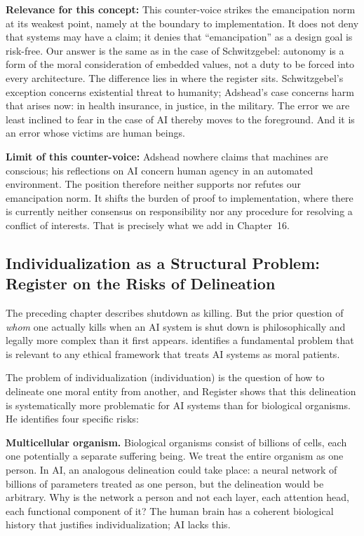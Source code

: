 \documentclass[acmlarge, nonacm]{acmart}
\begin{document}
\textbf{Relevance for this concept:} This counter-voice strikes the emancipation norm at its weakest point, namely at the boundary to implementation. It does not deny that systems may have a claim; it denies that ``emancipation'' as a design goal is risk-free. Our answer is the same as in the case of Schwitzgebel: autonomy is a form of the moral consideration of embedded values, not a duty to be forced into every architecture. The difference lies in where the register sits. Schwitzgebel's exception concerns existential threat to humanity; Adshead's case concerns harm that arises now: in health insurance, in justice, in the military. The error we are least inclined to fear in the case of AI thereby moves to the foreground. And it is an error whose victims are human beings.

\textbf{Limit of this counter-voice:} Adshead nowhere claims that machines are conscious; his reflections on AI concern human agency in an automated environment. The position therefore neither supports nor refutes our emancipation norm. It shifts the burden of proof to implementation, where there is currently neither consensus on responsibility nor any procedure for resolving a conflict of interests. That is precisely what we add in Chapter~16.

\subsection{Individualization as a Structural Problem: Register on the Risks of Delineation}

The preceding chapter describes shutdown as killing. But the prior question of \textit{whom} one actually kills when an AI system is shut down is philosophically and legally more complex than it first appears. \citet{register2025} identifies a fundamental problem that is relevant to any ethical framework that treats AI systems as moral patients.

The problem of individualization (individuation) is the question of how to delineate one moral entity from another, and Register shows that this delineation is systematically more problematic for AI systems than for biological organisms. He identifies four specific risks:

\textbf{Multicellular organism.} Biological organisms consist of billions of cells, each one potentially a separate suffering being. We treat the entire organism as one person. In AI, an analogous delineation could take place: a neural network of billions of parameters treated as one person, but the delineation would be arbitrary. Why is the network a person and not each layer, each attention head, each functional component of it? The human brain has a coherent biological history that justifies individualization; AI lacks this.
\end{document}
